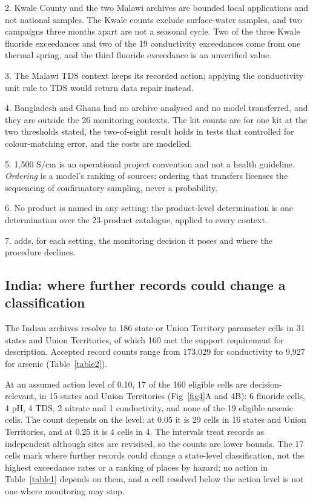 \documentclass[10pt,letterpaper]{article}
\begin{document}
{\begin{flushleft}
2. Kwale County and the two Malawi archives are bounded local applications and not national samples. The Kwale counts exclude surface-water samples, and two campaigns three months apart are not a seasonal cycle. Two of the three Kwale fluoride exceedances and two of the 19 conductivity exceedances come from one thermal spring, and the third fluoride exceedance is an unverified value.

3. The Malawi TDS context keeps its recorded action; applying the conductivity unit rule to TDS would return data repair instead.

4. Bangladesh and Ghana had no archive analysed and no model transferred, and they are outside the 26 monitoring contexts. The kit counts are for one kit at the two thresholds stated, the two-of-eight result holds in tests that controlled for colour-matching error, and the costs are modelled.

5. 1,500 \textmu{}S/cm is an operational project convention and not a health guideline. \textit{Ordering} is a model's ranking of sources; ordering that transfers licenses the sequencing of confirmatory sampling, never a probability.

6. No product is named in any setting: the product-level determination is one determination over the 23-product catalogue, applied to every context.

7.  adds, for each setting, the monitoring decision it poses and where the procedure declines.
\end{flushleft}
}
\linenumbers

\subsection*{India: where further records could change a classification}

The Indian archives resolve to 186 state or Union Territory \texttimes{} parameter cells in 31 states and Union Territories, of which 160 met the support requirement for description. Accepted record counts range from 173,029 for conductivity to 9,927 for arsenic (Table~\ref{table2}).

At an assumed action level of 0.10, 17 of the 160 eligible cells are decision-relevant, in 15 states and Union Territories (Fig~\ref{fig4}A and 4B): 6 fluoride cells, 4 pH, 4 TDS, 2 nitrate and 1 conductivity, and none of the 19 eligible arsenic cells. The count depends on the level: at 0.05 it is 29 cells in 16 states and Union Territories, and at 0.25 it is 4 cells in 4. The intervals treat records as independent although sites are revisited, so the counts are lower bounds. The 17 cells mark where further records could change a state-level classification, not the highest exceedance rates or a ranking of places by hazard; no action in Table~\ref{table1} depends on them, and a cell resolved below the action level is not one where monitoring may stop.
\end{document}
